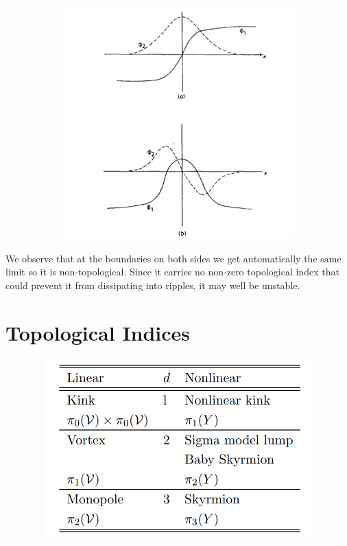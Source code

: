 \documentclass[a4paper, 12pt]{article}
\begin{document}
   \begin{figure}[ht]
    \centering
    \includegraphics[height=9cm, width=12cm]{fig4}
   \end{figure}
  We observe that at the boundaries on both sides we get automatically the same limit so it is non-topological. Since it carries no non-zero topological index that could prevent it from dissipating into ripples, it may well be unstable.
 
 \section {Topological Indices}
    \begin{figure}[ht]
    \centering
    \includegraphics[height=7cm, width=12cm]{fig5}
   \end{figure}
 
\end{document}
